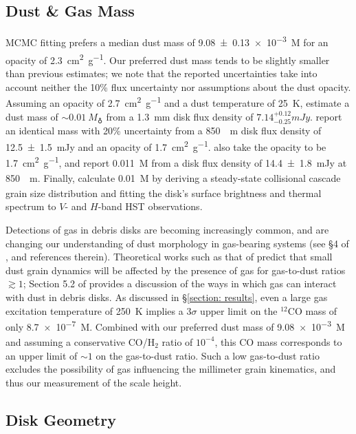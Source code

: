 \documentclass[modern]{aastex62}
\begin{document}
\subsection{Dust \& Gas Mass}
\label{subsection: dust mass}

MCMC fitting prefers a median dust mass of \SI{9.08 \pm 0.13e-3}{M_\earth} for an opacity of \SI{2.3}{cm^2.g^{-1}}.
Our preferred dust mass tends to be slightly smaller than previous estimates; we note that the reported uncertainties take into account neither the 10\% flux uncertainty nor assumptions about the dust opacity.
Assuming an opacity of \SI{2.7}{cm^2.g^{-1}} and a dust temperature of \SI{25}{K}, \citet{macgregor13} estimate a dust mass of $\sim \SI{0.01}{M_\earth}$ from a \SI{1.3}{mm} disk flux density of $7.14^{+0.12}_{-0.25} \si{mJy}$.
\citet{matthews15} report an identical mass with 20\% uncertainty from a \SI{850}{\mu m} disk flux density of \SI{12.5 \pm 1.5}{mJy} and an opacity of \SI{1.7}{cm^2.g^{-1}}.
\citet{liu04} also take the opacity to be \SI{1.7}{cm^2.g^{-1}}, and report \SI{0.011}{M_\earth} from a disk flux density of \SI{14.4 \pm 1.8}{mJy} at \SI{850}{\mu m}.
Finally, \citet{strubbe&chiang06} calculate \SI{0.01}{M_\earth} by deriving a steady-state collisional cascade grain size distribution and fitting the disk's surface brightness and thermal spectrum to $V$- and $H$-band HST observations.

Detections of gas in debris disks are becoming increasingly common, and are changing our understanding of dust morphology in gas-bearing systems (see \S 4 of \citealp{hughes18}, and references therein).
Theoretical works such as that of \citet{takeuchi&artymowcz01} predict that small dust grain dynamics will be affected by the presence of gas for gas-to-dust ratios $\gtrsim 1$; Section 5.2 of \citet{hughes17} provides a discussion of the ways in which gas can interact with dust in debris disks.
As discussed in \S \ref{section: results}, even a large gas excitation temperature of \SI{250}{K} implies a $3 \sigma$ upper limit on the $^{12}$CO mass of only \SI{8.7e-7}{M_\earth}. 
Combined with our preferred dust mass of \SI{9.08e-3}{M_\earth} and assuming a conservative CO/H$_2$ ratio of $10^{-4}$, this CO mass corresponds to an upper limit of $\sim 1$ on the gas-to-dust ratio.
Such a low gas-to-dust ratio excludes the possibility of gas influencing the millimeter grain kinematics, and thus our measurement of the scale height.

\subsection{Disk Geometry}
\label{subsection: disk geometry}
\end{document}
